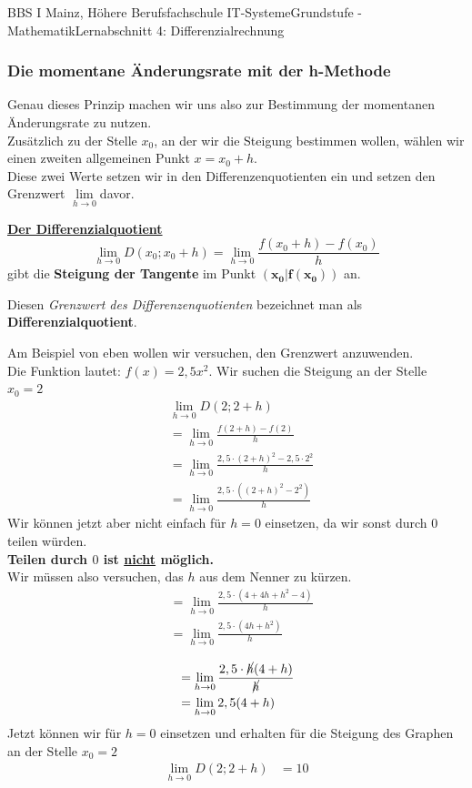 \documentclass[11pt,twocolumn,oneside,openany,headings=optiontotoc,11pt,numbers=noenddot,final]{article}
\begin{document}
\begin{worksheet}{BBS I Mainz, Höhere Berufsfachschule IT-Systeme}{Grundstufe - Mathematik}{Lernabschnitt 4: Differenzialrechnung}
		\subsubsection{Die momentane Änderungsrate mit der h-Methode}
		Genau dieses Prinzip machen wir uns also zur Bestimmung der momentanen Änderungsrate zu nutzen.\\
		Zusätzlich zu der Stelle \(x_0\), an der wir die Steigung bestimmen wollen, wählen wir einen zweiten allgemeinen Punkt \(x = x_0 + h\).\\
		Diese zwei Werte setzen wir in den Differenzenquotienten ein und setzen den Grenzwert \(\lim\limits_{h\rightarrow{}0}\)davor.
		\begin{framed}
			\noindent
			\textbf{\underline{Der Differenzialquotient}}
			\[\lim\limits_{h\rightarrow{}0} D(x_0;x_0+h) = \lim\limits_{h\rightarrow{}0} \frac{f(x_0+h) - f(x_0)}{h}\]
			gibt die \textbf{Steigung der Tangente} im Punkt \(\mathbf{(x_0|f(x_0))}\) an.\\
			\par\noindent
			Diesen \textit{Grenzwert des Differenzenquotienten} bezeichnet man als \textbf{Differenzialquotient}.
		\end{framed}
		\noindent
		Am Beispiel von eben wollen wir versuchen, den Grenzwert anzuwenden.\\
		Die Funktion lautet: \(f(x) = 2,5x^2\). Wir suchen die Steigung an der Stelle \(x_0=2\)
		\begin{align*}
			& \lim\limits_{h\rightarrow{}0} D(2;2+h)\\
			& = \lim\limits_{h\rightarrow{}0} \frac{f(2+h)-f(2)}{h}\\
			& = \lim\limits_{h\rightarrow{}0} \frac{2,5\cdot(2+h)^2 - 2,5\cdot{}2^2}{h}\\
			& = \lim\limits_{h\rightarrow{}0} \frac{2,5\cdot((2+h)^2 - 2^2)}{h}
		\end{align*}
		Wir können jetzt aber nicht einfach für \(h = 0\) einsetzen, da wir sonst durch \(0\) teilen würden.\\
		\textbf{Teilen durch \(0\) ist \underline{nicht} möglich.}\\
		Wir müssen also versuchen, das \(h\) aus dem Nenner zu kürzen.
		\begin{align*}
			& = \lim\limits_{h\rightarrow{}0} \frac{2,5\cdot(4 + 4h + h^2 - 4)}{h}\\
			& = \lim\limits_{h\rightarrow{}0} \frac{2,5\cdot(4h + h^2)}{h}\\
		\end{align*}
		\begin{align*}
			& = \lim\limits_{h\rightarrow{}0} \frac{2,5\cdot\cancel{h}(4 + h)}{\cancel{h}}\\
			& = \lim\limits_{h\rightarrow{}0} 2,5(4 + h)\\
		\end{align*}
		Jetzt können wir für \(h = 0\) einsetzen und erhalten für die Steigung des Graphen an der Stelle \(x_0=2\)
		\begin{align*}
			\lim\limits_{h\rightarrow{}0} D(2;2+h) & = 10
		\end{align*}
	\end{worksheet}
\end{document}
